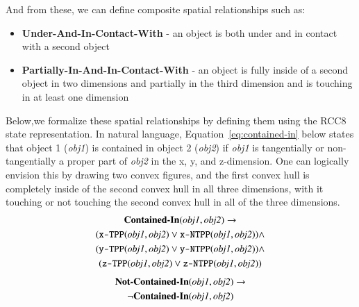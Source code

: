 \documentclass[preprint,12pt]{elsarticle}
\newcommand{\obj}[1] {\textit{#1}}
\newcommand{\sr}[1] {\textbf{#1}}
\begin{document}
And from these, we can define composite spatial relationships such as:
\begin{itemize}
  \item \sr{Under-And-In-Contact-With} - an object is both under and in contact with a second object
  \item \sr{Partially-In-And-In-Contact-With} - an object is fully inside of a second object in two dimensions and partially in the third dimension and is touching in at least one dimension
\end{itemize}
Below,we formalize these spatial relationships by defining them using the RCC8 state representation. In natural language, Equation~\ref{eq:contained-in} below states that object 1 (\obj{obj1}) is contained in object 2 (\obj{obj2}) if \obj{obj1} is tangentially or non-tangentially a proper part of \obj{obj2} in the x, y, and z-dimension. One can logically envision this by drawing two convex figures, and the first convex hull is completely inside of the second convex hull in all three dimensions, with it touching or not touching the second convex hull in all of the three dimensions.
\begin{gather}
\label{eq:contained-in}
\textbf{Contained-In}(\textit{obj1}, \textit{obj2}) \rightarrow  \\
(\texttt{x-TPP}(\textit{obj1}, \textit{obj2}) \vee \texttt{x-NTPP}(\textit{obj1}, \textit{obj2})) \wedge \notag\\
(\texttt{y-TPP}(\textit{obj1}, \textit{obj2}) \vee \texttt{y-NTPP}(\textit{obj1}, \textit{obj2})) \wedge \notag\\
(\texttt{z-TPP}(\textit{obj1}, \textit{obj2}) \vee \texttt{z-NTPP}(\textit{obj1}, \textit{obj2}))\notag
\end{gather}
\begin{gather}
\label{eq:not-contained-in}
\textbf{Not-Contained-In}(\textit{obj1}, \textit{obj2}) \rightarrow\\
\neg \textbf{Contained-In}(\textit{obj1}, \textit{obj2}) \notag
\end{gather}
\end{document}
